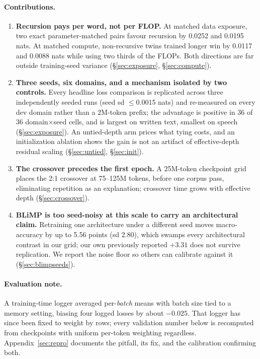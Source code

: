 \documentclass[11pt]{article}
\begin{document}
\paragraph{Contributions.}
\begin{enumerate}
\item \textbf{Recursion pays per word, not per FLOP.} At matched data exposure, two exact parameter-matched pairs favour recursion by 0.0252 and 0.0195 nats. At matched compute, non-recursive twins trained longer win by 0.0117 and 0.0088 nats while using two thirds of the FLOPs. Both directions are far outside training-seed variance (\S\ref{sec:exposure}, \S\ref{sec:compute}).
\item \textbf{Three seeds, six domains, and a mechanism isolated by two controls.} Every headline loss comparison is replicated across three independently seeded runs (seed sd $\leq$0.0015 nats) and re-measured on every dev domain rather than a 2M-token prefix; the advantage is positive in 36 of 36 domain$\times$seed cells, and is largest on written text, smallest on speech (\S\ref{sec:exposure}). An untied-depth arm prices what tying costs, and an initialization ablation shows the gain is not an artifact of effective-depth residual scaling (\S\ref{sec:untied}, \S\ref{sec:init}).
\item \textbf{The crossover precedes the first epoch.} A 25M-token checkpoint grid places the 2:1 crossover at 75--125M tokens, before one corpus pass, eliminating repetition as an explanation; crossover time grows with effective depth (\S\ref{sec:crossover}).
\item \textbf{BLiMP is too seed-noisy at this scale to carry an architectural claim.} Retraining one architecture under a different seed moves macro-accuracy by up to 5.56 points (sd 2.80), which swamps every architectural contrast in our grid; our own previously reported $+3.31$ does not survive replication. We report the noise floor so others can calibrate against it (\S\ref{sec:blimpseeds}).
\end{enumerate}

\paragraph{Evaluation note.} A training-time logger averaged per-\emph{batch} means with batch size tied to a memory setting, biasing four logged losses by about $-0.025$. That logger has since been fixed to weight by rows; every validation number below is recomputed from checkpoints with uniform per-token weighting regardless. Appendix~\ref{sec:repro} documents the pitfall, its fix, and the calibration confirming both.
\end{document}
